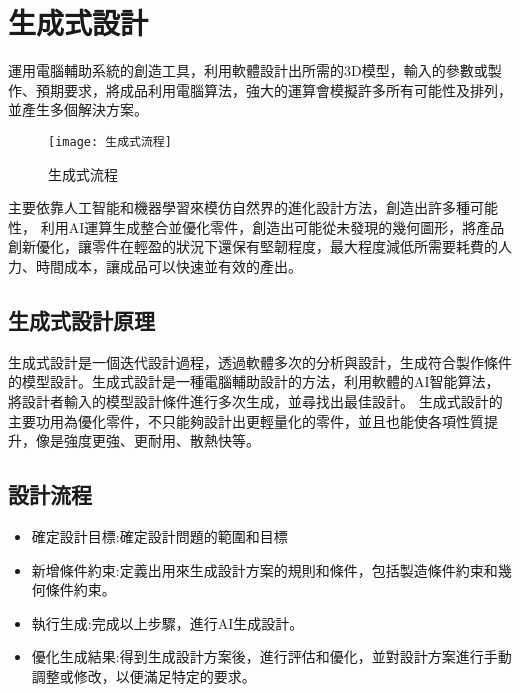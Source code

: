 \chapter{生成式設計}
運用電腦輔助系統的創造工具，利用軟體設計出所需的3D模型，輸入的參數或製作、預期要求，將成品利用電腦算法，強大的運算會模擬許多所有可能性及排列，並產生多個解決方案。\\

\begin{figure}[hbt!]
\center
\texttt{[image: 生成式流程]}
\caption{\Large 生成式流程}
\label{生成式流程}
\end{figure}


主要依靠人工智能和機器學習來模仿自然界的進化設計方法，創造出許多種可能性，
利用AI運算生成整合並優化零件，創造出可能從未發現的幾何圖形，將產品創新優化，讓零件在輕盈的狀況下還保有堅韌程度，最大程度減低所需要耗費的人力、時間成本，讓成品可以快速並有效的產出。\\

\section{生成式設計原理}
生成式設計是一個迭代設計過程，透過軟體多次的分析與設計，生成符合製作條件的模型設計。生成式設計是一種電腦輔助設計的方法，利用軟體的AI智能算法，將設計者輸入的模型設計條件進行多次生成，並尋找出最佳設計。
生成式設計的主要功用為優化零件，不只能夠設計出更輕量化的零件，並且也能使各項性質提升，像是強度更強、更耐用、散熱快等。\\

\section{設計流程}
\begin{itemize}
\item 確定設計目標:確定設計問題的範圍和目標
\item 新增條件約束:定義出用來生成設計方案的規則和條件，包括製造條件約束和幾何條件約束。
\item	執行生成:完成以上步驟，進行AI生成設計。
\item 優化生成結果:得到生成設計方案後，進行評估和優化，並對設計方案進行手動調整或修改，以便滿足特定的要求。\\

\end{itemize}

